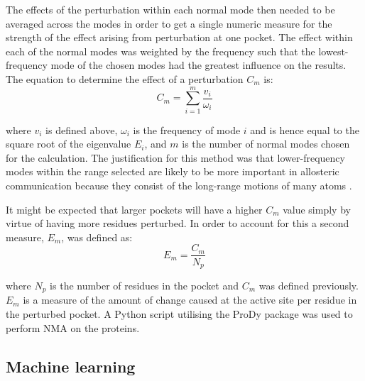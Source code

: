 The effects of the perturbation within each normal mode then needed to be averaged across the modes in order to get a single numeric measure for the strength of the effect arising from perturbation at one pocket.
The effect within each of the normal modes was weighted by the frequency such that the lowest-frequency mode of the chosen modes had the greatest influence on the results.
The equation to determine the effect of a perturbation $C_{m}$ is:
$$
C_{m} = \sum_{i=1}^{m} \frac{v_{i}}{\omega_{i}}
$$

where $v_{i}$ is defined above, $\omega_{i}$ is the frequency of mode $i$ and is hence equal to the square root of the eigenvalue $E_{i}$, and $m$ is the number of normal modes chosen for the calculation.
The justification for this method was that lower-frequency modes within the range selected are likely to be more important in allosteric communication because they consist of the long-range motions of many atoms \cite{Rodgers2013}.

It might be expected that larger pockets will have a higher $C_{m}$ value simply by virtue of having more residues perturbed.
In order to account for this a second measure, $E_{m}$, was defined as:
$$
E_{m} = \frac{C_{m}}{N_{p}}
$$

where $N_{p}$ is the number of residues in the pocket and $C_{m}$ was defined previously.
$E_{m}$ is a measure of the amount of change caused at the active site per residue in the perturbed pocket.
A Python script utilising the ProDy package \cite{Bakan2011} was used to perform NMA on the proteins.


\subsection{Machine learning}

